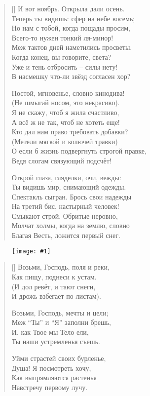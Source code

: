 \documentclass[12pt,a5paper,twoside]{article}
\newcommand{\pict}[1]{\thispagestyle{empty}\begin{figure}[H]\begin{center}\texttt{[image: \#1]}\end{center}\end{figure}\newpage}
\begin{document}
\settowidth{\versewidth}{И вот ноябрь. Открыла дали осень.}
\begin{verse}[\versewidth]
И вот ноябрь. Открыла дали осень.\\
Теперь ты видишь: сфер на небе восемь;\\
Но нам с тобой, когда пощады просим,\\
Всего-то нужен тонкий ля-минор!\\
Меж тактов дней наметились просветы.\\
Когда конец, вы говорите, света?\\
Уже и тень отбросить – силы нету!\\
В насмешку что-ли звёзд согласен хор?

Постой, мгновенье, словно кинодива!\\
(Не шмыгай носом, это некрасиво).\\
Я не скажу, чтоб я жила счастливо,\\
А всё ж не так, чтоб не хотеть еще!\\
Кто дал нам право требовать добавки?\\
(Метели мягкой и колючей травки)\\
О если б жизнь подвергнуть строгой правке,\\
Ведя слогам связующий подсчёт!

Открой глаза, гляделки, очи, вежды:\\
Ты видишь мир, снимающий одежды.\\
Спектакль сыгран. Брось свои надежды\\
На третий бис, настырный человек!\\
Смыкают строй. Обритые неровно,\\
Молчат холмы, когда на землю, словно\\
Благая Весть, ложится первый снег.
\end{verse}
\newpage



\pict{picts/Pasxalnoe_poslednee} 
%



\settowidth{\versewidth}{Возьми, Господь, поля и реки,}
\begin{verse}[\versewidth]
Возьми, Господь, поля и реки,\\
Как пищу, поднеси к устам.\\
(И дол ревёт, и тают снеги,\\
И дрожь взбегает по листам).

Возьми, Господь, мечты и цели;\\
Меж “Ты” и  “Я” заполни брешь,\\
И, как Твое мы Тело ели,\\
Ты наши устремленья съешь.

Уйми страстей своих бурленье,\\
Душа! Я посмотреть хочу,\\
Как выпрямляются растенья\\
Навстречу первому лучу.
\end{verse}
\newpage
\end{document}
